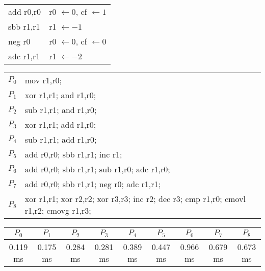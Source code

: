 \documentclass{beamer}
\renewcommand{\gets}{\leftarrow}
\begin{document}
\begin{frame}
\begin{table}
\tiny
\begin{tabular}{l|l}
add r0,r0
& r0 $\gets 0$, cf $\gets 1$ \\
sbb r1,r1
& r1 $\gets -1$ \\
neg r0
& r0 $\gets 0$, cf $\gets 0$ \\
adc r1,r1
& r1 $\gets -2$ \\
\end{tabular}
\end{table}
\end{frame}

\begin{frame}
\begin{table}
\tiny
\begin{tabular}{l|l}
$P_0$ & mov r1,r0; \\
$P_1$ & xor r1,r1; and r1,r0; \\
$P_2$ & sub r1,r1; and r1,r0; \\
$P_3$ & xor r1,r1; add r1,r0; \\
$P_4$ & sub r1,r1; add r1,r0; \\
$P_5$ & add r0,r0; sbb r1,r1; inc r1; \\
$P_6$ & add r0,r0; sbb r1,r1; sub r1,r0; adc r1,r0; \\
$P_7$ & add r0,r0; sbb r1,r1; neg r0; adc r1,r1; \\
$P_8$ & xor r1,r1; xor r2,r2; xor r3,r3; inc r2; dec r3; cmp r1,r0; cmovl r1,r2; cmovg r1,r3; \\
\end{tabular}
\end{table}
\end{frame}

\begin{frame}
\begin{table}
\tiny
\setlength{\tabcolsep}{1mm}
\begin{tabular}{*{9}{c}}
$P_0$    & $P_1$    & $P_2$    & $P_3$    & $P_4$    & $P_5$    & $P_6$    & $P_7$    & $P_8$    \\
\hline
0.119 ms & 0.175 ms & 0.284 ms & 0.281 ms & 0.389 ms & 0.447 ms & 0.966 ms & 0.679 ms & 0.673 ms \\
\end{tabular}
\end{table}
\end{frame}
\end{document}
